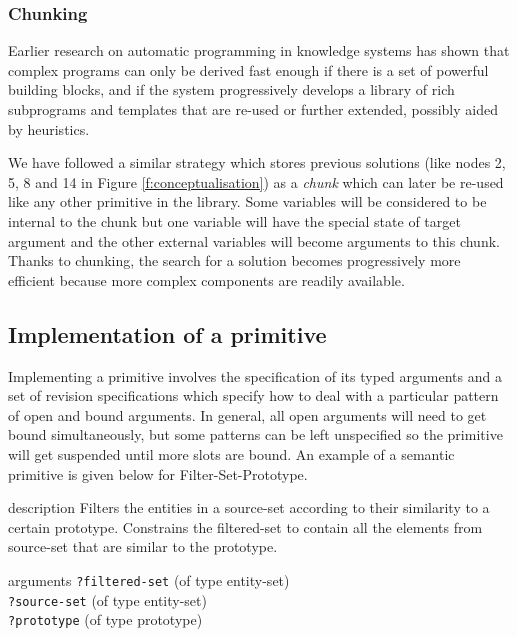 \subsubsection*{Chunking}
\label{s:irl-chunking}

Earlier research on automatic programming in knowledge systems
\citep[see e.g.][]{barstow79knowledge} has shown that complex programs
can only be derived fast enough if there is a set of powerful building
blocks, and if the system progressively develops a library of rich
subprograms and templates that are re-used or further extended,
possibly aided by heuristics.

We have followed a similar strategy which stores previous solutions
(like nodes 2, 5, 8 and 14 in Figure \ref{f:conceptualisation}) as a
\emph{chunk} which can later be re-used like any other primitive in
the library. Some variables will be considered to be internal to the
chunk but one variable will have the special state of target argument
and the other external variables will become arguments to this
chunk. Thanks to chunking, the search for a solution becomes
progressively more efficient because more complex components are
readily available.

\subsection{Implementation of a primitive}

Implementing a primitive involves the specification of its typed
arguments and a set of revision specifications which specify how to
deal with a particular pattern of open and bound arguments. In
general, all open arguments will need to get bound simultaneously, but
some patterns can be left unspecified so the primitive will get
suspended until more slots are bound. An example of a semantic
primitive is given below for {\sc Filter-Set-Prototype}.


\begin{explanation}{description}
  Filters the entities in a source-set according to their similarity
  to a certain prototype. Constrains the filtered-set to contain all
  the elements from source-set that are similar to the prototype.
\end{explanation}

\begin{explanation}{arguments}
\verb+?filtered-set+ (of type entity-set) \\
\verb+?source-set+ (of type entity-set) \\
\verb+?prototype+ (of type prototype)
\end{explanation}

